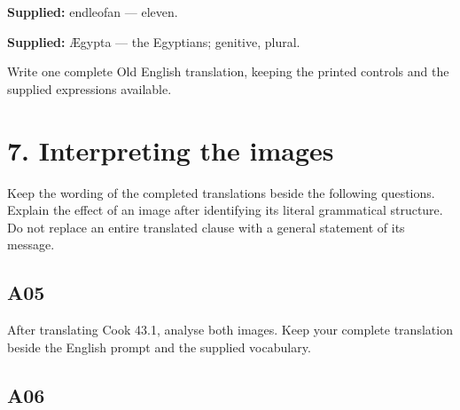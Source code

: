 \textbf{Supplied:} endleofan — eleven.

\textbf{Supplied:} Ægypta — the Egyptians; genitive, plural.

Write one complete Old English translation, keeping the printed controls and the supplied expressions available.

\section*{7. Interpreting the images}

Keep the wording of the completed translations beside the following questions. Explain the effect of an image after identifying its literal grammatical structure. Do not replace an entire translated clause with a general statement of its message.

\subsection*{A05}

After translating Cook 43.1, analyse both images. Keep your complete translation beside the English prompt and the supplied vocabulary.




\subsection*{A06}

